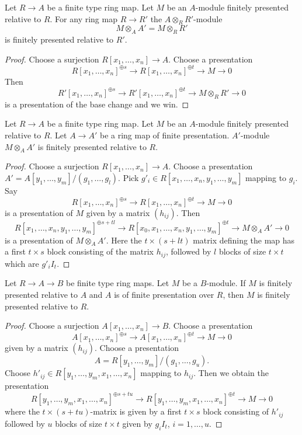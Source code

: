 \begin{lemma}
\label{lemma-base-change-relative-finite-presentation}
Let $R \to A$ be a finite type ring map. Let $M$ be an $A$-module finitely
presented relative to $R$. For any ring map $R \to R'$ the
$A \otimes_R R'$-module
$$
M \otimes_A A' = M \otimes_R R'
$$
is finitely presented relative to $R'$.
\end{lemma}

\begin{proof}
Choose a surjection $R[x_1, \ldots, x_n] \to A$. Choose a presentation
$$
R[x_1, \ldots, x_n]^{\oplus s} \to
R[x_1, \ldots, x_n]^{\oplus t} \to M \to 0
$$
Then
$$
R'[x_1, \ldots, x_n]^{\oplus s} \to
R'[x_1, \ldots, x_n]^{\oplus t} \to M \otimes_R R' \to 0
$$
is a presentation of the base change and we win.
\end{proof}

\begin{lemma}
\label{lemma-pull-relative-finite-presentation}
Let $R \to A$ be a finite type ring map.
Let $M$ be an $A$-module finitely presented relative to $R$.
Let $A \to A'$ be a ring map of finite presentation.
$A'$-module $M \otimes_A A'$ is finitely presented relative to $R$.
\end{lemma}

\begin{proof}
Choose a surjection $R[x_1, \ldots, x_n] \to A$. Choose a presentation
$A' = A[y_1, \ldots, y_m]/(g_1, \ldots, g_l)$.
Pick $g'_i \in R[x_1, \ldots, x_n, y_1, \ldots, y_m]$ mapping to $g_i$.
Say
$$
R[x_1, \ldots, x_n]^{\oplus s} \to
R[x_1, \ldots, x_n]^{\oplus t} \to M \to 0
$$
is a presentation of $M$ given by a matrix $(h_{ij})$.
Then
$$
R[x_1, \ldots, x_n, y_1, \ldots, y_m]^{\oplus s + tl} \to
R[x_0, x_1, \ldots, x_n, y_1, \ldots, y_m]^{\oplus t} \to M \otimes_A A' \to 0
$$
is a presentation of $M \otimes_A A'$.
Here the $t \times (s + lt)$ matrix defining the map has a first
$t \times s$ block consisting of the matrix $h_{ij}$, followed
by $l$ blocks of size $t \times t$ which are $g'_iI_t$.
\end{proof}

\begin{lemma}
\label{lemma-composition-relative-finite-presentation}
Let $R \to A \to B$ be finite type ring maps. Let $M$ be a $B$-module.
If $M$ is finitely presented relative to $A$ and $A$ is of finite presentation
over $R$, then $M$ is finitely presented relative to $R$.
\end{lemma}

\begin{proof}
Choose a surjection $A[x_1, \ldots, x_n] \to B$.
Choose a presentation
$$
A[x_1, \ldots, x_n]^{\oplus s} \to
A[x_1, \ldots, x_n]^{\oplus t} \to M \to 0
$$
given by a matrix $(h_{ij})$. Choose a presentation
$$
A = R[y_1, \ldots, y_m]/(g_1, \ldots, g_u).
$$
Choose $h'_{ij} \in R[y_1, \ldots, y_m, x_1, \ldots, x_n]$
mapping to $h_{ij}$. Then we obtain the presentation
$$
R[y_1, \ldots, y_m, x_1, \ldots, x_n]^{\oplus s + tu} \to
R[y_1, \ldots, y_m, x_1, \ldots, x_n]^{\oplus t} \to M \to 0
$$
where the $t \times (s + tu)$-matrix is given by a first $t \times s$ block
consisting of $h'_{ij}$ followed by $u$ blocks of size $t \times t$ given
by $g_iI_t$, $i = 1, \ldots, u$.
\end{proof}

